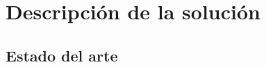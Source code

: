 \section{Descripción de la solución}
\begin{comment}
En la presente sección se describe el estado del arte y las características de la solución. Se explicara cual es el propósito de la solución, y posteriormente los alcances y limitaciones establecidas.
\end{comment}

\subsection{Estado del arte}
\begin{comment}
La más frecuente técnica para inducir cambios rápidos y significativos en la \pam\, ha sido la deflación repentina de los manguitos sobre el muslo \citep{Aaslid1989, Aaslid1991,Lagi1994, Newell1994, Strebel1995, Tiecks1995a}. Con este enfoque, se colocan los manguitos alrededor de ambos muslos y se  genera una presión de \mmhg{20-40} por encima de la presión sistólica durante 2 minutos. Sin embargo, con una autorregulación normal la \cbfv\, vuelve y alcanza su estado basal antes que la \pam. \cite{Aaslid1989} demuestran que la velocidad de recuperación se ve afectada de manera significativa por los niveles de la \pacoo.

La evaluación de la \ca\, mediante el análisis de la función de transferencia está basado en minimizar, en la \ca, el efecto de la oscilación espontánea sobre la \cbfv. El método ha sido extensamente utilizado, por ejemplo, en la investivación del control cardiocasvular, arrítmia sinusal respiratoria y autoregulación renal \citep{Saul1989, Saul1991, Holstein1991}. El análisis espectral, al igual que la transformada rápida de Fourier, transforma la serie en el tiempo de la \bp\, y la \cbfv\, al dominio de la frecuencia. Entonces, la función de transferencia entre las dos señales se calcula como: $$ H(f) = \frac{S_{xy}(f)}{S_{xx}(f)} $$ donde $S_{xx}(f)$ es el autoespectro entre la señal de entrada, \bp, y la de señal de salida, \cbfv \citep{Ainslie2008}. Con la función de potencia relativa asociada (ganancia) y al tiempo (fase) puede ser descrito usando la parte real $H_{R}(f)$ y la parte imaginaria $H_{I}(f)$ de la función de transferencia compleja
\begin{eqnarray}
    \mbox{ganancia : } |H(f)| &=& \sqrt{|H_{R}(f)|^2 + |H_{I}(f)|^2}\\
    \mbox{fase : } \Phi(f) &=& \tan^{-1}\left(\frac{|H_{R}(f)|}{|H_{I}(f)|}\right)
\end{eqnarray}


\end{comment}
